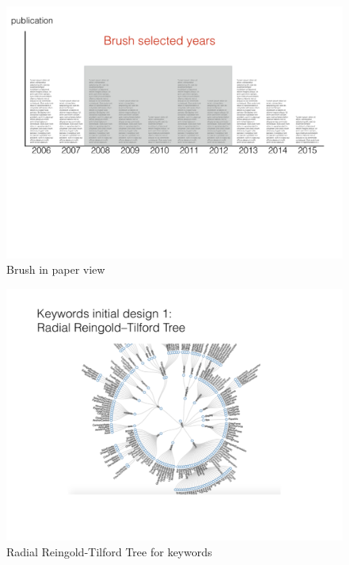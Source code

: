 \begin{figure}[htb!]
    \centering
    \includegraphics[width=160mm]{visproposalDrawing_page_Part_7.pdf}
    \caption{Brush in paper view}
    \label{fig:brush}
\end{figure}

\begin{figure}[htb!]
    \centering
    \includegraphics[width=160mm]{visproposalDrawing_page_Part_9.pdf}
    \caption{Radial Reingold-Tilford Tree for keywords}
    \label{fig:radial_tree}
\end{figure}

